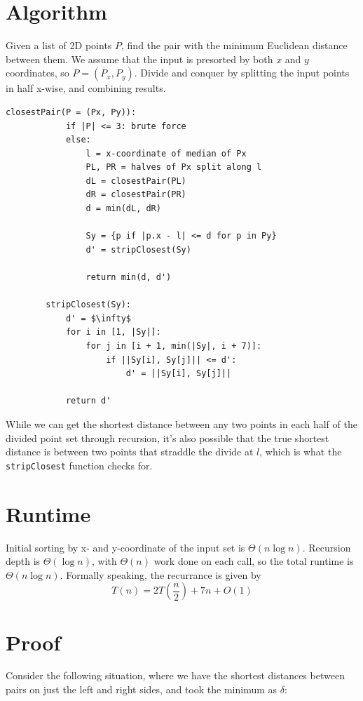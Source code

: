 \documentclass[11pt]{article}
\begin{document}
\section{Algorithm}
	Given a list of 2D points $P$, find the pair with the minimum Euclidean distance between them. We assume that the input is presorted by both $x$ and $y$ coordinates, so $P = (P_x, P_y)$. Divide and conquer by splitting the input points in half x-wise, and combining results.
	
	\begin{lstlisting}[autogobble=true,mathescape]
		closestPair(P = (Px, Py)):
			if |P| <= 3: brute force
			else:
				l = x-coordinate of median of Px
				PL, PR = halves of Px split along l
				dL = closestPair(PL)
				dR = closestPair(PR)
				d = min(dL, dR)
				
				Sy = {p if |p.x - l| <= d for p in Py}
				d' = stripClosest(Sy)
				
				return min(d, d')
				
		stripClosest(Sy):
			d' = $\infty$
			for i in [1, |Sy|]:
				for j in [i + 1, min(|Sy|, i + 7)]:
					if ||Sy[i], Sy[j]|| <= d':
						d' = ||Sy[i], Sy[j]||
						
			return d'
	\end{lstlisting}
	
	While we can get the shortest distance between any two points in each half of the divided point set through recursion, it's also possible that the true shortest distance is between two points that straddle the divide at $l$, which is what the \verb|stripClosest| function checks for.
	
\section{Runtime}
	Initial sorting by x- and y-coordinate of the input set is $\Theta(n\log n)$. Recursion depth is $\Theta(\log n)$, with $\Theta(n)$ work done on each call, so the total runtime is $\Theta(n\log n)$. Formally speaking, the recurrance is given by
	\begin{equation}
		T(n) = 2T\left( \frac{n}{2} \right) + 7n + O(1)
	\end{equation}
	
\section{Proof}
	Consider the following situation, where we have the shortest distances between pairs on just the left and right sides, and took the minimum as $\delta$:
	
\end{document}
